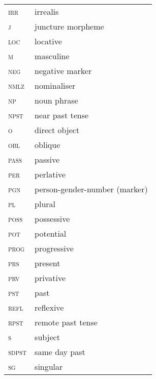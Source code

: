 \documentclass[output=paper]{LSP/langsci}
\begin{document}
\begin{tabularx}{.45\textwidth}{lQ}
\textsc{irr} & irrealis\\
\textsc{j} & juncture morpheme\\
\textsc{loc} & locative\\
\textsc{m} & masculine\\
\textsc{neg} & negative marker\\
\textsc{nmlz} & nominaliser\\
\textsc{np} & noun phrase\\
\textsc{npst} & near past tense\\
\textsc{o} & {direct object}\\
\textsc{obl} & oblique\\
\textsc{pass} & passive\\
\textsc{per} & perlative\\
\textsc{pgn} & person-gender-number (marker)\\
\textsc{pl} & plural\\
\textsc{poss} & possessive\\
\textsc{pot} & potential\\
\textsc{prog} & progressive\\
\textsc{prs} & present\\
\textsc{prv} & privative\\
\textsc{pst} & past\\
\textsc{refl} & reflexive\\
\textsc{rpst} & remote past tense\\
\textsc{s} & subject\\
\textsc{sdpst} & same day past\\
\textsc{sg} & singular\\
\end{tabularx}

{\sloppy
\printbibliography[heading=subbibliography,notkeyword=this] }
\end{document}

